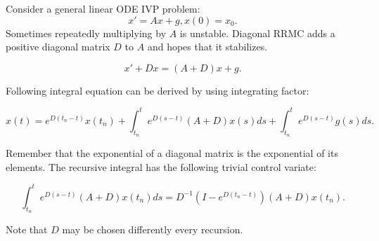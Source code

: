 \documentclass[a4paper,12pt]{article}
\begin{document}
\begin{definition}[DRRMC]
    Consider a general linear ODE IVP problem:
    \begin{equation}
        x' = Ax+g, x(0)= x_{0}.
    \end{equation}
    Sometimes repeatedly multiplying by $A$ is unstable.
    Diagonal RRMC adds a positive diagonal matrix $D$
    to $A$ and hopes that it stabilizes.

    \begin{equation}
        x' + Dx = (A+D)x+g.
    \end{equation}

    Following integral equation can be derived by using integrating factor:

    \begin{equation}\label{eq:int eq DRRMC}
        x(t)= e^{D(t_{n}-t)}x(t_{n}) + \int_{t_{n}}^{t} e^{D(s-t)}(A+D)x(s)ds+\int_{t_{n}}^{t} e^{D(s-t)}g(s)ds.
    \end{equation}

    Remember that the exponential of a diagonal matrix is the exponential of its elements.
    The recursive integral has the following trivial control variate:

    \begin{equation}\label{eq: CV DRRMC}
        \int_{t_{n}}^{t}  e^{D(s-t)}(A+D)x(t_{n})ds = D^{-1}(I-e^{D(t_{n}-t)})(A+D)x(t_{n}).
    \end{equation}

    Note that $D$ may be chosen differently every recursion.
\end{definition}
\end{document}
